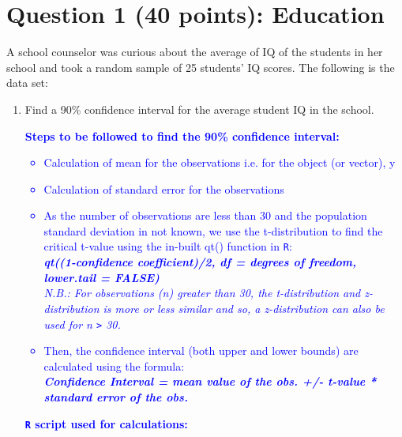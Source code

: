 \documentclass[12pt,letterpaper]{article}
\begin{document}
\pagebreak
\section*{Question 1 (40 points): Education}
A school counselor was curious about the average of IQ of the students in her school and took a random sample of 25 students' IQ scores. The following is the data set:\\

  

\begin{enumerate}
	\item Find a 90\% confidence interval for the average student IQ in the school.

\vspace{0.25cm}

\textcolor{blue}{
\textbf{Steps to be followed to find the 90\% confidence interval:}
\begin{itemize}
	\item Calculation of mean for the observations i.e. for the object (or vector), y
	\item Calculation of standard error for the observations
	\item As the number of observations are less than 30 and the population standard deviation in not known, we use the t-distribution to find the critical t-value using the in-built qt() function in \texttt{R}:
	\vspace*{0.25cm}\\
	\textbf{\textit{qt((1-confidence coefficient)/2, df = degrees of freedom, lower.tail = FALSE) }}
	\vspace*{0.25cm}\\	
	\textit{N.B.: For observations (n) greater than 30, the t-distribution and z-distribution is more or less similar and so, a z-distribution can also be used for n \texttt{>} 30.}
	\item Then, the confidence interval (both upper and lower bounds) are calculated using the formula:
	\vspace*{0.25cm}\\
	\textbf{\textit{Confidence Interval = mean value of the obs. +/- t-value * standard error of the obs.}}
\end{itemize}
}

\textcolor{blue}{
	\textbf{\texttt{R} script used for calculations:}
}


\pagebreak 


\end{enumerate}
\end{document}
